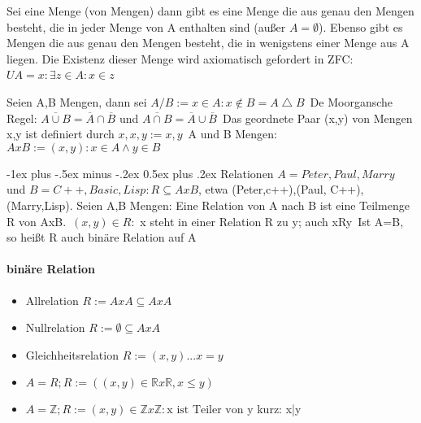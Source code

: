 \documentclass[10pt,landscape]{article}
\makeatletter
\renewcommand{\section}{\@startsection{section}{1}{0mm}%
                                {-1ex plus -.5ex minus -.2ex}%
                                {0.5ex plus .2ex}%
                                {\normalfont\large\bfseries}}
\makeatother
\begin{document}
\begin{multicols}{3}
Sei eine Menge (von Mengen) dann gibt es eine Menge die aus genau den Mengen besteht, die in jeder Menge von A enthalten sind (außer $A=\emptyset$).
Ebenso gibt es Mengen die aus genau den Mengen besteht, die in wenigstens einer Menge aus A liegen. Die Existenz dieser Menge wird axiomatisch gefordert in ZFC:$ UA = {x: \exists z \in A: x \in z}$\

Seien A,B Mengen, dann sei $A/B:={x\in A: x\not \in B } = A\bigtriangleup B$\
De Moorgansche Regel: $\overline{A \cup B} = \overline{A} \cap \overline{B}$ und $\overline{A\cap B}=\overline{A}\cup \overline{B}$\
Das geordnete Paar (x,y) von Mengen x,y ist definiert durch ${{x},{x,y}}:={x,y}$\
A und B Mengen: $A x B:={(x,y):x\in A \wedge y \in B}$

\section{Relationen}
$A={Peter, Paul, Marry}$ und $B={C++, Basic, Lisp}: R\subseteq AxB$, etwa {(Peter,c++),(Paul, C++), (Marry,Lisp)}. Seien A,B Mengen: Eine Relation von A nach B ist eine Teilmenge R von AxB.\
$(x,y)\in R:$ x steht in einer Relation R zu y; auch xRy\
Ist A=B, so heißt R auch binäre Relation auf A

\paragraph{binäre Relation}
\begin{itemize}
    \item Allrelation $R:=AxA \subseteq AxA$
    \item Nullrelation $R:=\emptyset \subseteq AxA$
    \item Gleichheitsrelation $R:={(x,y)... x=y}$
    \item $A=R; R:=((x,y)\in \mathbb{R} x \mathbb{R}, x \leq y)$
    \item $A=\mathbb{Z}; R:={(x,y)\in \mathbb{Z} x \mathbb{Z}: \text{x ist Teiler von y} }$ kurz: x|y
\end{itemize}


\end{multicols}
\end{document}
